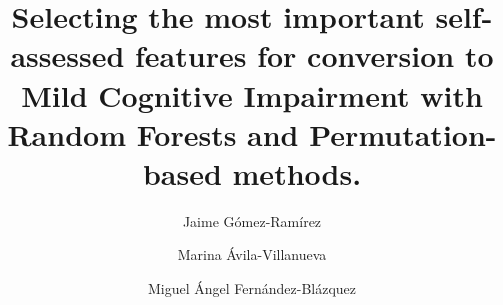 \documentclass[preprint,12pt]{elsarticle}
\begin{document}
\begin{frontmatter}




\title{Selecting the most important self-assessed features for conversion to Mild Cognitive Impairment with Random Forests and Permutation-based methods.}

\author{Jaime Gómez-Ramírez}
\author{Marina Ávila-Villanueva}
\author{Miguel Ángel Fernández-Blázquez}

\address{Fundaci\'on Reina Sof\'ia \\     Centre for Research in Neurodegenarative Diseases (Fundaci\'on CIEN) \\ \emph{Valderrebollo, 5, 28031 Madrid, Spain}}



\end{frontmatter}
\end{document}
